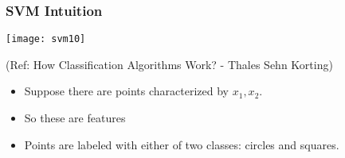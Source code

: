 \begin{frame}[fragile] \frametitle{SVM Intuition}

\begin{center}
\texttt{[image: svm10]}

\tiny{(Ref: How Classification Algorithms Work? - Thales Sehn Korting)}
\end{center}
\begin{itemize}
\item Suppose there are points characterized by $x_1,x_2$.
\item So these are features
\item Points are labeled with either of two classes: circles and squares.
\end{itemize}
\end{frame}









